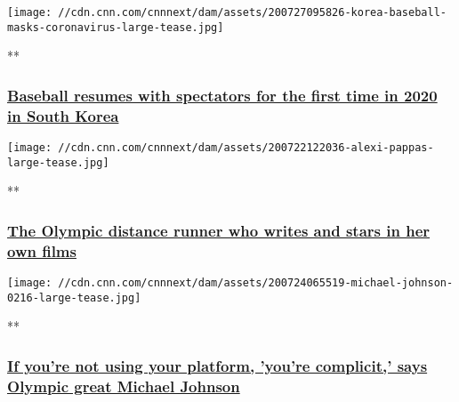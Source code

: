 \href{/videos/sports/2020/07/27/baseball-south-korea-fans-allowed-coronavirus-spt-intl.cnn}{}

\texttt{[image: //cdn.cnn.com/cnnnext/dam/assets/200727095826-korea-baseball-masks-coronavirus-large-tease.jpg]}

**

\hypertarget{baseball-resumes-with-spectators-for-the-first-time-in-2020-in-south-korea}{%
\subsubsection{\texorpdfstring{\href{/videos/sports/2020/07/27/baseball-south-korea-fans-allowed-coronavirus-spt-intl.cnn}{Baseball
resumes with spectators for the first time in 2020 in South
Korea}}{Baseball resumes with spectators for the first time in 2020 in South Korea}}\label{baseball-resumes-with-spectators-for-the-first-time-in-2020-in-south-korea}}

\href{/videos/sports/2020/07/21/alexi-pappas-marathon-tokyo-2020-olympics-10k-filmmaker-spt-intl-lon-orig.cnn}{}

\texttt{[image: //cdn.cnn.com/cnnnext/dam/assets/200722122036-alexi-pappas-large-tease.jpg]}

**

\hypertarget{the-olympic-distance-runner-who-writes-and-stars-in-her-own-films}{%
\subsubsection{\texorpdfstring{\href{/videos/sports/2020/07/21/alexi-pappas-marathon-tokyo-2020-olympics-10k-filmmaker-spt-intl-lon-orig.cnn}{The
Olympic distance runner who writes and stars in her own
films}}{The Olympic distance runner who writes and stars in her own films}}\label{the-olympic-distance-runner-who-writes-and-stars-in-her-own-films}}

\href{/videos/sports/2020/07/24/michael-johnson-olympic-games-racism-blm-lewis-hamilton-lebron-james-spt-intl.cnn}{}

\texttt{[image: //cdn.cnn.com/cnnnext/dam/assets/200724065519-michael-johnson-0216-large-tease.jpg]}

**

\hypertarget{if-youre-not-using-your-platform-youre-complicit-says-olympic-great-michael-johnson}{%
\subsubsection{\texorpdfstring{\href{/videos/sports/2020/07/24/michael-johnson-olympic-games-racism-blm-lewis-hamilton-lebron-james-spt-intl.cnn}{If
you're not using your platform, 'you're complicit,' says Olympic great
Michael
Johnson}}{If you're not using your platform, 'you're complicit,' says Olympic great Michael Johnson}}\label{if-youre-not-using-your-platform-youre-complicit-says-olympic-great-michael-johnson}}


